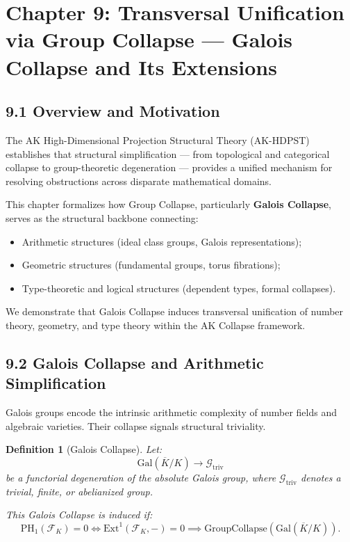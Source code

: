 \documentclass[11pt]{article}
\newtheorem{definition}[theorem]{Definition}
\begin{document}
\section{Chapter 9: Transversal Unification via Group Collapse — Galois Collapse and Its Extensions}

\subsection*{9.1 Overview and Motivation}

The AK High-Dimensional Projection Structural Theory (AK-HDPST) establishes that structural simplification — from topological and categorical collapse to group-theoretic degeneration — provides a unified mechanism for resolving obstructions across disparate mathematical domains.

This chapter formalizes how Group Collapse, particularly \textbf{Galois Collapse}, serves as the structural backbone connecting:

\begin{itemize}
    \item Arithmetic structures (ideal class groups, Galois representations);
    \item Geometric structures (fundamental groups, torus fibrations);
    \item Type-theoretic and logical structures (dependent types, formal collapses).
\end{itemize}

We demonstrate that Galois Collapse induces transversal unification of number theory, geometry, and type theory within the AK Collapse framework.

\subsection*{9.2 Galois Collapse and Arithmetic Simplification}

Galois groups encode the intrinsic arithmetic complexity of number fields and algebraic varieties. Their collapse signals structural triviality.

\begin{definition}[Galois Collapse]
Let:
\[
\mathrm{Gal}(\overline{K}/K) \longrightarrow \mathcal{G}_{\mathrm{triv}}
\]
be a functorial degeneration of the absolute Galois group, where \( \mathcal{G}_{\mathrm{triv}} \) denotes a trivial, finite, or abelianized group.

This Galois Collapse is induced if:
\[
\mathrm{PH}_1(\mathcal{F}_K) = 0 \iff \mathrm{Ext}^1(\mathcal{F}_K, -) = 0 \implies \mathrm{GroupCollapse}(\mathrm{Gal}(\overline{K}/K)).
\]
\end{definition}
\end{document}
